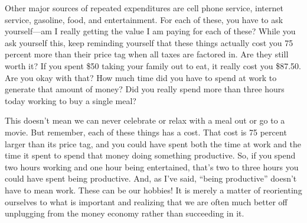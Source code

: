 Other major sources of repeated expenditures are cell phone service,
internet service, gasoline, food, and entertainment. For each of these,
you have to ask yourself—am I really getting the value I am paying for
each of these? While you ask yourself this, keep reminding yourself
that these things actually cost you 75 percent more than their price
tag when all taxes are factored in. Are they still worth it? If you
spent \$50 taking your family out to eat, it really cost you \$87.50.
Are you okay with that? How much time did you have to spend at work to
generate that amount of money? Did you really spend more than three
hours today working to buy a single meal?

This doesn’t mean we can never celebrate or relax with a meal out or go
to a movie. But remember, each of these things has a cost. That cost is
75 percent larger than its price tag, and you could have spent both the
time at work and the time it spent to spend that money doing something
productive. So, if you spend two hours working and one hour being
entertained, that’s two to three hours you could have spent being
productive. And, as I’ve said, ``being productive'' doesn’t have to mean
work. These can be our hobbies!  It is merely a matter of reorienting
ourselves to what is important and realizing that we are often much
better off unplugging from the money economy rather than succeeding in
it.

